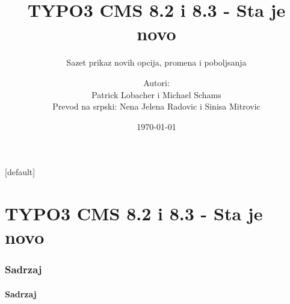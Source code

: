 \documentclass[t]{beamer}
\title{TYPO3 CMS 8.2 i 8.3 - Sta je novo}
\subtitle{Sazet prikaz novih opcija, promena i poboljsanja}
\author{
	\centerline{Autori:}
	\centerline{Patrick Lobacher i Michael Schams}
	\centerline{Prevod na srpski: Nena Jelena Radovic i Sinisa Mitrovic} 
}
\date{\today}
\begin{document}
\sharefont


\begingroup
	[default]
	\begin{frame}
		\titlepage
	\end{frame}
\endgroup


\section*{TYPO3 CMS 8.2 i 8.3 - Sta je novo}
\begin{frame}[fragile]
	\frametitle{Sadrzaj}
	\framesubtitle{Sadrzaj}

	\tableofcontents

\end{frame}










\end{document}
